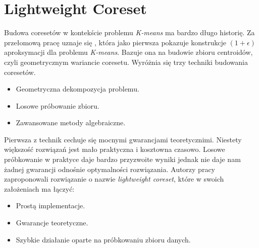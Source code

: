 \chapter{Lightweight Coreset}

Budowa coresetów w kontekście problemu \textit{K-means} ma bardzo długo historię.
Za przełomową pracę uznaje się \cite{Matousek99onapproximate}, która jako pierwsza pokazuje konstrukcje $(1+\epsilon)$ aproksymacji dla problemu \textit{K-means}.
Bazuje ona na budowie zbioru centroidów, czyli geometrycznym wariancie coresetu.
Wyróżnia się trzy techniki budowania coresetów.
\begin{itemize}
    \item Geometryczna dekompozycja problemu.
    \item Losowe próbowanie zbioru.
    \item Zawansowane metody algebraiczne.
\end{itemize}
Pierwsza z technik cechuje się mocnymi gwarancjami teoretycznimi.
Niestety większość rozwiązań jest mało praktyczna i kosztowna czasowo.
Losowe próbkowanie w praktyce daje bardzo przyzwoite wyniki jednak nie daje nam żadnej gwarancji odnośnie optymalności rozwiązania.
Autorzy pracy \cite{bachem2017scalable} zaproponowali rozwiązanie o nazwie \textit{lightweight coreset}, które w swoich założeniach ma łączyć:
\begin{itemize}
    \item Prostą implementacje.
    \item Gwarancje teoretyczne.
    \item Szybkie działanie oparte na próbkowaniu zbioru danych.
\end{itemize}


